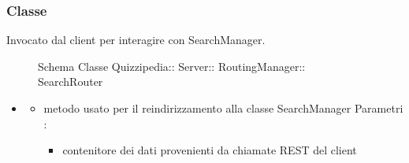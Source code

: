 \subsubsection{Classe }
Invocato dal client per interagire con SearchManager.
\begin{figure}[H]
\centering
\noindent{}
\caption[Schema Classe SearchRouter]{Schema Classe Quizzipedia:: Server:: RoutingManager:: SearchRouter}
\end{figure}
\begin{itemize}
\item {}
\begin{itemize}
\item {}
\newline
metodo usato per il reindirizzamento alla classe SearchManager
\newline
Parametri :
\begin{itemize}
\item {}
\newline
contenitore dei dati provenienti da chiamate REST del client
\end{itemize}
\end{itemize}
\end{itemize}
